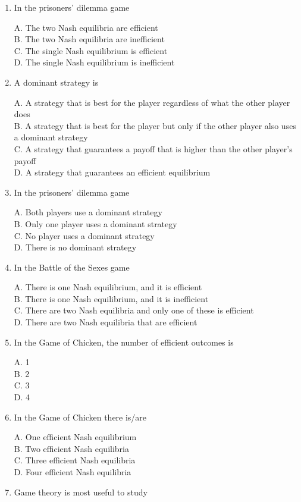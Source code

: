 \documentclass[
]{book}
\begin{document}
\begin{enumerate}
\def\labelenumi{\arabic{enumi}.}
\item
  In the prisoners' dilemma game

  A. The two Nash equilibria are efficient\\
  B. The two Nash equilibria are inefficient\\
  C. The single Nash equilibrium is efficient\\
  D. The single Nash equilibrium is inefficient
\item
  A dominant strategy is

  A. A strategy that is best for the player regardless of what the other player does\\
  B. A strategy that is best for the player but only if the other player also uses a dominant strategy\\
  C. A strategy that guarantees a payoff that is higher than the other player's payoff\\
  D. A strategy that guarantees an efficient equilibrium
\item
  In the prisoners' dilemma game

  A. Both players use a dominant strategy\\
  B. Only one player uses a dominant strategy\\
  C. No player uses a dominant strategy\\
  D. There is no dominant strategy
\item
  In the Battle of the Sexes game

  A. There is one Nash equilibrium, and it is efficient\\
  B. There is one Nash equilibrium, and it is inefficient\\
  C. There are two Nash equilibria and only one of these is efficient\\
  D. There are two Nash equilibria that are efficient
\item
  In the Game of Chicken, the number of efficient outcomes is

  A. 1\\
  B. 2\\
  C. 3\\
  D. 4
\item
  In the Game of Chicken there is/are

  A. One efficient Nash equilibrium\\
  B. Two efficient Nash equilibria\\
  C. Three efficient Nash equilibria\\
  D. Four efficient Nash equilibria
\item
  Game theory is most useful to study


\end{enumerate}
\end{document}
